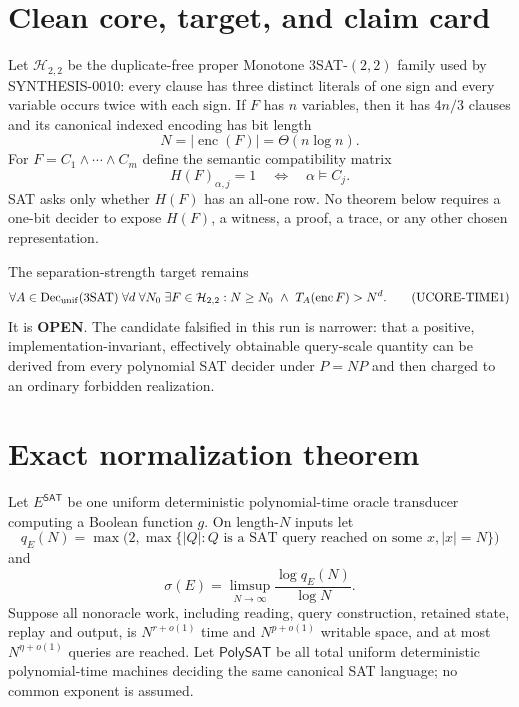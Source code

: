 \documentclass[11pt]{article}
\newcommand{\SAT}{\mathsf{SAT}}
\newcommand{\OPEN}{\textbf{OPEN}}
\begin{document}
\section{Clean core, target, and claim card}

Let $\mathcal H_{2,2}$ be the duplicate-free proper Monotone
$3$SAT-$(2,2)$ family used by SYNTHESIS-0010: every clause has three
distinct literals of one sign and every variable occurs twice with each
sign.  If $F$ has $n$ variables, then it has $4n/3$ clauses and its canonical
indexed encoding has bit length
\[
 N=|\operatorname{enc}(F)|=\Theta(n\log n).
\]
For $F=C_1\wedge\cdots\wedge C_m$ define the semantic compatibility matrix
\[
 H(F)_{\alpha,j}=1\quad\Longleftrightarrow\quad \alpha\models C_j.
\]
SAT asks only whether $H(F)$ has an all-one row.  No theorem below requires a
one-bit decider to expose $H(F)$, a witness, a proof, a trace, or any other
chosen representation.

The separation-strength target remains
\[
 \forall A\in\operatorname{Dec}_{\rm unif}(3\mathrm{SAT})\;
 \forall d\;\forall N_0\;\exists F\in\mathcal H_{2,2}:
 N\ge N_0\ \wedge\ T_A(\operatorname{enc}F)>N^d.
 \tag{UCORE-TIME1}
\]
It is \OPEN.  The candidate falsified in this run is narrower: that a
positive, implementation-invariant, effectively obtainable query-scale
quantity can be derived from every polynomial SAT decider under $P=NP$ and
then charged to an ordinary forbidden realization.

\section{Exact normalization theorem}

Let $E^{\SAT}$ be one uniform deterministic polynomial-time oracle
transducer computing a Boolean function $g$.  On length-$N$ inputs let
\[
 q_E(N)=\max\bigl(2,\max\{|Q|:Q\text{ is a SAT query reached on some }x,
 |x|=N\}\bigr)
\]
and
\[
 \sigma(E)=\limsup_{N\to\infty}\frac{\log q_E(N)}{\log N}.
\]
Suppose all nonoracle work, including reading, query construction, retained
state, replay and output, is $N^{r+o(1)}$ time and $N^{p+o(1)}$ writable
space, and at most $N^{\eta+o(1)}$ queries are reached.  Let
$\mathsf{PolySAT}$ be all total uniform deterministic polynomial-time
machines deciding the same canonical SAT language; no common exponent is
assumed.
\end{document}
